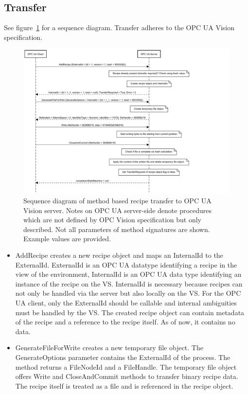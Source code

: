 \subsection{Transfer}
See figure~\ref{fig:runtimeviewgen} for a sequence diagram. Transfer adheres to the OPC UA Vision specification.
\begin{figure}
    \centering
    \includegraphics[width=1.2\textwidth]{img/OPCUAVisionAddRecipe.pdf}
    \caption[Sequence diagram of method based recipe transfer]{Sequence diagram of method based recipe transfer to OPC UA Vision server. Notes on OPC UA server-side denote procedures which are not defined by OPC Vision specification but only described. Not all parameters of method signatures are shown. Example values are provided.}
    \label{fig:runtimeviewgen}
\end{figure}
    \begin{itemize}
        \item AddRecipe creates a new recipe object and maps an InternalId to the ExternalId. ExternalId is an OPC UA datatype identifying a recipe in the view of the environment, InternalId is an OPC UA data type identifying an instance of the recipe on the VS.  InternalId is necessary because recipes can not only be handled via the server but also locally on the VS. For the OPC UA client, only the ExternalId should be callable and internal ambiguities must be handled by the VS. The created recipe object can contain metadata of the recipe and a reference to the recipe itself. As of now, it contains no data.
    	\item GenerateFileForWrite creates a new temporary file object. The GenerateOptions parameter contains the ExternalId of the process. The method returns a FileNodeId and a FileHandle. The temporary file object offers Write and CloseAndCommit methods to transfer binary recipe data. The recipe itself is treated as a file and is referenced in the recipe object.
    \end{itemize}
